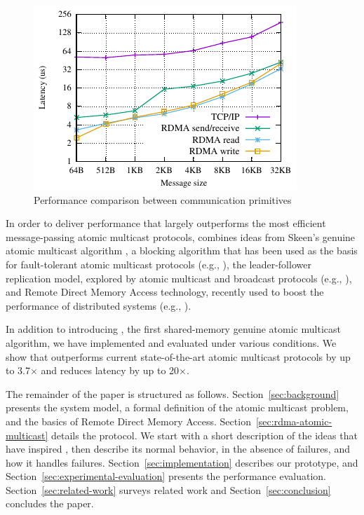 \begin{figure}[htp!]
    \centering
    \includegraphics[width=0.99\columnwidth]{figures/benchmark/graphs/figure-protocol-bench.pdf}
  \caption{Performance comparison between communication primitives}
  \label{fig:perfcomp}
\end{figure}

In order to deliver performance that largely outperforms the most efficient message-passing atomic multicast protocols, \libname combines ideas from Skeen's genuine atomic multicast algorithm \cite{BJ87b}, a blocking algorithm that has been used as the basis for fault-tolerant atomic multicast protocols (e.g., \cite{Coelho2017,gotsman2019white}), the leader-follower replication model, explored by atomic multicast and broadcast protocols (e.g., \cite{gotsman2019white,Junqueira2011,Mu}), and Remote Direct Memory Access technology, recently used to boost the performance of distributed systems (e.g., \cite{Aguilera2019,kalia2014using, kalia2016design, mitchell2013using}).

In addition to introducing \libname, the first shared-memory genuine atomic multicast algorithm, we have implemented and evaluated \libname under various conditions. 
We show that \libname outperforms current state-of-the-art atomic multicast protocols by up to 3.7$\times$ and reduces latency by up to 20$\times$.

The remainder of the paper is structured as follows.
Section~\ref{sec:background} presents the system model, a formal definition of the atomic multicast problem, and the basics of Remote Direct Memory Access.
Section~\ref{sec:rdma-atomic-multicast} details the \libname protocol.
We start with a short description of the ideas that have inspired \libname, then describe its normal behavior, in the absence of failures, and how it handles failures.
Section~\ref{sec:implementation} describes our prototype, and Section~\ref{sec:experimental-evaluation} presents the performance evaluation.
Section~\ref{sec:related-work} surveys related work and Section~\ref{sec:conclusion} concludes the paper.

